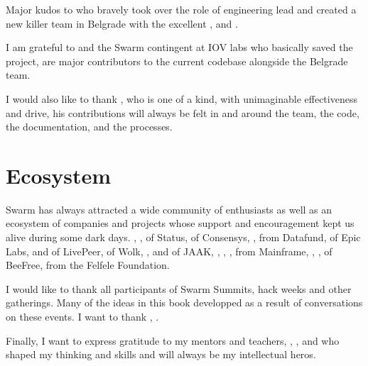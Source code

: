 Major kudos to  who bravely took over the role of engineering lead and created a new killer team in Belgrade with the excellent ,  and . 

I am grateful to  and the Swarm contingent at IOV labs who basically saved the project,  are major contributors to the current codebase alongside the  Belgrade team. 

I would also like to thank , who is one of a kind, with unimaginable effectiveness and drive, his contributions will always be felt in and around the team, the code, the documentation, and the processes.

\section*{Ecosystem}

Swarm has always attracted a wide community of enthusiasts as well as an ecosystem of companies and projects whose support and encouragement kept us alive during some dark days. 
, ,  of Status,  of Consensys, ,  from Datafund,  of Epic Labs,  and  of LivePeer,  of Wolk, ,  and  of JAAK, , , ,  from Mainframe, , ,  of BeeFree,  from the  Felfele Foundation. 

I would like to thank all participants of Swarm  Summits, hack weeks and other gatherings. Many of the ideas in this book developped as a result of conversations on these events. I want to thank , .

Finally, I want to express gratitude to my mentors and teachers, , ,  and  who shaped my thinking and skills and will always be my intellectual heros.



